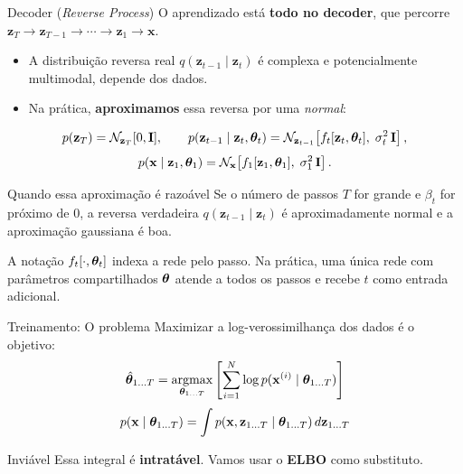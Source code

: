 \documentclass[aspectratio=169,xcolor=dvipsnames]{beamer}
\begin{document}
  \begin{frame}{Decoder (\textit{Reverse Process})}
    O aprendizado está \textbf{todo no decoder}, que percorre
    $\mathbf{z}_T \to \mathbf{z}_{T-1} \to \cdots \to \mathbf{z}_1 \to \mathbf{x}$.
    \begin{itemize}
      \item A distribuição reversa real $q(\mathbf{z}_{t-1} \mid \mathbf{z}_t)$ é
      complexa e potencialmente multimodal, depende dos dados.
      \item Na prática, \textbf{aproximamos} essa reversa por uma
      \emph{normal}:
    \end{itemize}
    \[
      p(\mathbf{z}_T) = \mathcal{N}_{\mathbf{z}_T}[0,\mathbf{I}],
      \qquad
      p(\mathbf{z}_{t-1} \mid \mathbf{z}_t,\bm{\theta}_t) = \mathcal{N}_{\mathbf{z}_{t-1}}\!\left[f_t[\mathbf{z}_t,\bm{\theta}_t],\; \sigma_t^{2}\,\mathbf{I}\right],
    \]
    \[
      p(\mathbf{x} \mid \mathbf{z}_1,\bm{\theta}_1) = \mathcal{N}_{\mathbf{x}}\!\left[f_1[\mathbf{z}_1,\bm{\theta}_1],\; \sigma_1^{2}\,\mathbf{I}\right].
    \]
    \begin{block}{Quando essa aproximação é razoável}
      Se o número de passos $T$ for grande e $\beta_t$ for próximo de
      0, a reversa verdadeira $q(\mathbf{z}_{t-1} \mid \mathbf{z}_t)$ é
      aproximadamente normal e a aproximação gaussiana é boa.
    \end{block}
    \par
    \begin{footnotesize}
      \noindent A notação $f_t[\cdot,\bm{\theta}_t]$ indexa a rede pelo
      passo. Na prática, uma única rede com parâmetros compartilhados
      $\bm{\theta}$ atende a todos os passos e recebe $t$ como entrada
      adicional.\par
    \end{footnotesize}
  \end{frame}


  \begin{frame}{Treinamento: O problema}
    Maximizar a log-verossimilhança dos dados é o objetivo:
    \vspace{0.3em}
    \[
      \hat{\bm{\theta}}_{1\ldots T} = \operatorname*{argmax}_{\bm{\theta}_{1\ldots T}}
      \left[\sum_{i=1}^{N} \log p(\mathbf{x}^{(i)} \mid \bm{\theta}_{1\ldots T})\right]
    \]
    \[
      p(\mathbf{x} \mid \bm{\theta}_{1\ldots T}) = \int p(\mathbf{x}, \mathbf{z}_{1\ldots T} \mid \bm{\theta}_{1\ldots T})\, d\mathbf{z}_{1\ldots T}
    \]
    \begin{alertblock}{Inviável}
      Essa integral é \textbf{intratável}. Vamos usar o
      \textbf{ELBO} como substituto.
    \end{alertblock}
  \end{frame}
\end{document}
